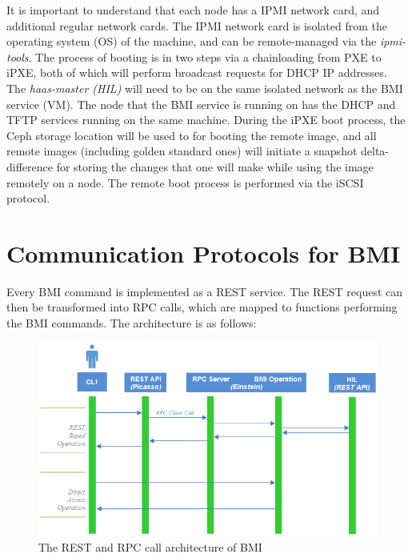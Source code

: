 It is important to understand that each node has a IPMI network card, and additional regular network cards.  The IPMI network card is isolated from the operating system (OS) of the machine, and can be remote-managed via the \emph{ipmi-tools}.  The process of booting is in two steps via a chainloading from PXE to iPXE, both of which will perform broadcast requests for DHCP IP addresses.  The \emph{haas-master (HIL)} will need to be on the same isolated network as the BMI service (VM).  The node that the BMI service is running on has the DHCP and TFTP services running on the same machine.  During the iPXE boot process, the Ceph storage location will be used to for booting the remote image, and all remote images (including golden standard ones) will initiate a snapshot delta-difference for storing the changes that one will make while using the image remotely on a node.  The remote boot process is performed via the iSCSI protocol. \\







\section{Communication Protocols for BMI}

Every BMI command is implemented as a REST service.  The REST request can then be transformed into RPC calls, which are mapped to functions performing the BMI commands.  The architecture is as follows: \\

\begin{figure}[!h] %
\begin{center}
\includegraphics[scale=0.8]{figures/rest-rpc-bmi-calls-more-arrows-v2.png}
\end{center}
\caption{The REST and RPC call architecture of BMI}
\label{fig:bmi-rest-rpc-architecture}
\end{figure}

